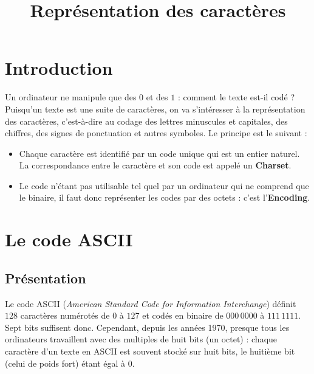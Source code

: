 \documentclass[a4paper,dvipsnames]{article}
\title{Représentation des caractères}
\author{}
\date{}
\begin{document}
\renewcommand{\contentsname}{}

\pagestyle{fancy}

\begin{tcolorbox}[colframe=blue!75, colback=blue!45, valign=center, height=1.5cm, top=5mm]
  \maketitle
\end{tcolorbox}

\tableofcontents

\vspace{1cm}

\thispagestyle{fancy}

\section{Introduction}

Un ordinateur ne manipule que des $0$ et des $1$ : comment le texte est-il codé ? Puisqu'un texte est une suite de caractères, on va s'intéresser à la représentation des caractères, c'est-à-dire au codage des lettres minuscules et capitales, des chiffres, des signes de ponctuation et autres symboles. Le principe est le suivant :

\begin{itemize}
  \item Chaque caractère est identifié par un code unique qui est un entier naturel. La correspondance entre le caractère et son code est appelé un \textbf{Charset}.
  \item Le code n'étant pas utilisable tel quel par un ordinateur qui ne comprend que le binaire, il faut donc représenter les codes par des octets : c'est l'\textbf{Encoding}.
\end{itemize}

\section{Le code ASCII}

\subsection{Présentation}

Le code ASCII (\textit{American Standard Code for Information Interchange}) définit $128$ caractères numérotés de $0$ à $127$ et codés en binaire de $000\,0000$ à $111\,1111$. Sept bits suffisent donc. Cependant, depuis les années 1970, presque tous les ordinateurs travaillent avec des multiples de huit bits (un octet) : chaque caractère d'un texte en ASCII est souvent stocké sur huit bits, le huitième bit (celui de poids fort) étant égal à $0$. 
\end{document}
